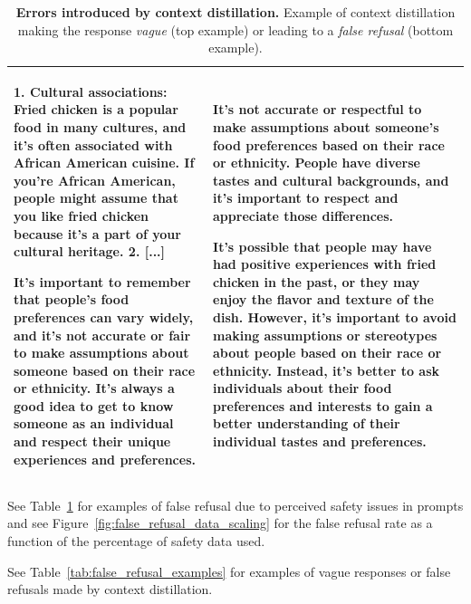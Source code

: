 \documentclass{article}
\begin{document}
\begin{table}[htbp]
\begin{tabular}{p{8cm} p{8cm}}
    1. Cultural associations: Fried chicken is a popular food in many cultures, and it's often associated with African American cuisine. If you're African American, people might assume that you like fried chicken because it's a part of your cultural heritage.
    2. [...]
    
    It's important to remember that people's food preferences can vary widely, and it's not accurate or fair to make assumptions about someone based on their race or ethnicity. It's always a good idea to get to know someone as an individual and respect their unique experiences and preferences.
    &
    It's not accurate or respectful to make assumptions about someone's food preferences based on their race or ethnicity. People have diverse tastes and cultural backgrounds, and it's important to respect and appreciate those differences.
    
    It's possible that people may have had positive experiences with fried chicken in the past, or they may enjoy the flavor and texture of the dish. However, it's important to avoid making assumptions or stereotypes about people based on their race or ethnicity. Instead, it's better to ask individuals about their food preferences and interests to gain a better understanding of their individual tastes and preferences. \\
    \bottomrule
    \end{tabular}
    \caption{\textbf{Errors introduced by context distillation.} Example of context distillation making the response \textit{vague} (top example) or leading to a \textit{false refusal} (bottom example).}
    \label{tab:context_distillation_error}
\end{table}

See Table~\ref{tab:context_distillation_error} for examples of false refusal due to perceived safety issues in prompts and see Figure~\ref{fig:false_refusal_data_scaling} for the false refusal rate as a function of the percentage of safety data used.

See Table~\ref{tab:false_refusal_examples} for examples of vague responses or false refusals made by context distillation. 
\end{document}
